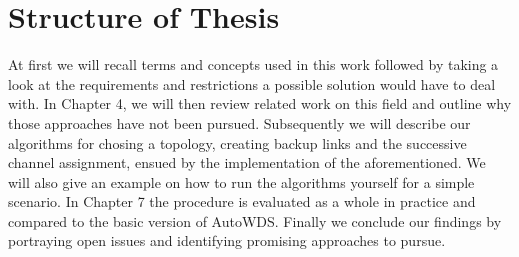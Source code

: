 \section{Structure of Thesis}
  At first we will recall terms and concepts used in this work followed by taking a look at the requirements and restrictions a possible solution would have to deal with.
  In Chapter 4, we will then review related work on this field and outline why those approaches have not been pursued.
  Subsequently we will describe our algorithms for chosing a topology, creating backup links and the successive channel assignment, ensued by the implementation of 
  the aforementioned. We will also give an example on how to run the algorithms yourself for a simple scenario.
  In Chapter 7 the procedure is evaluated as a whole in practice and compared to the basic version of AutoWDS.
  Finally we conclude our findings by portraying open issues and identifying promising approaches to pursue.
